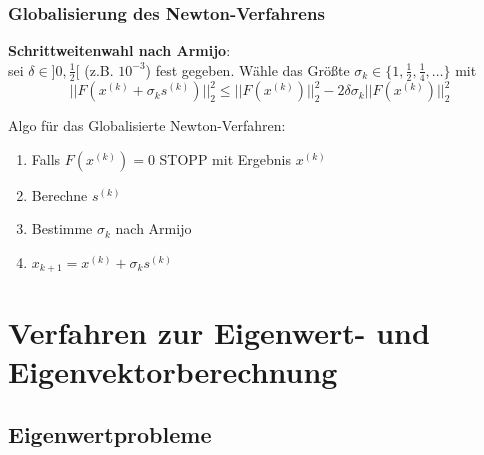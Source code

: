 \documentclass[
	ngerman,
	accentcolor=9c,%
	type=intern,
	marginpar=false
	]{tudapub}
\begin{document}
            \subsubsection{Globalisierung des Newton-Verfahrens}
                \textbf{Schrittweitenwahl nach Armijo}:\\
                sei $\delta \in ]0, \frac{1}{2}[$ (z.B. $10^{-3}$) fest gegeben.
                Wähle das Größte $\sigma_k \in \{1, \frac{1}{2}, \frac{1}{4}, \dots\}$ mit 
                \begin{equation*}
                    ||F(x^{(k)} + \sigma_k s^{(k)})||_2^2 \leq ||F(x^{(k)})||_2^2-2\delta \sigma_k ||F(x^{(k)})||_2^2
                \end{equation*} 
                \begin{satz}
                    Algo für das Globalisierte Newton-Verfahren:
                    \begin{enumerate}
                        \item Falls $F(x^{(k)}) = 0$ STOPP mit Ergebnis $x^{(k)}$
                        \item Berechne $s^{(k)}$
                        \item Bestimme $\sigma_k$ nach Armijo
                        \item $x_{k+1} = x^{(k)} + \sigma_ks^{(k)}$
                    \end{enumerate}
                \end{satz}
                \newpage
    \section{Verfahren zur Eigenwert- und Eigenvektorberechnung}
        \subsection{Eigenwertprobleme}
\end{document}

